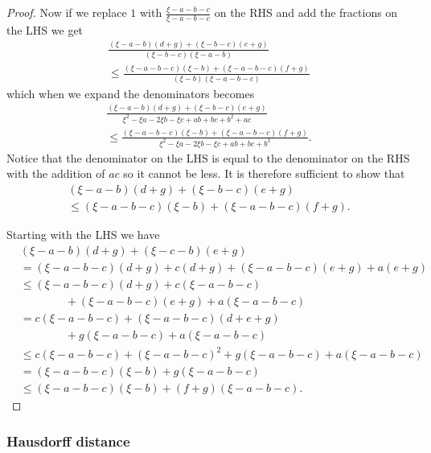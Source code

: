 \begin{proof}
  Now if we replace $1$ with $\frac{\xi -a-b-c}{\xi -a-b-c}$ on the RHS and add
  the fractions on the LHS we get
  \begin{multline*}
    \frac{(\xi -a-b)(d+g)+(\xi -b-c)(e+g)}{(\xi -b-c)(\xi -a-b)}\\
    \leq \frac{(\xi -a-b-c)(\xi -b)+(\xi -a-b-c)(f+g)}{(\xi -b)(\xi -a-b-c)}
  \end{multline*}
  which when we expand the denominators becomes
  \begin{multline*}
    \frac{(\xi -a-b)(d+g)+(\xi -b-c)(e+g)}{\xi ^2-\xi a-2\xi b-\xi c+ab+bc+b^2+ac}\\
    \leq \frac{(\xi -a-b-c)(\xi -b)+(\xi -a-b-c)(f+g)}{\xi ^2-\xi a-2\xi b-\xi c+ab+bc+b^2}.
  \end{multline*}
  Notice that the denominator on the LHS is equal to the denominator on the
  RHS with the addition of $ac$ so it cannot be less.  It is therefore
  sufficient to show that
  \begin{multline*}
    (\xi -a-b)(d+g)+(\xi -b-c)(e+g)\\
    \leq (\xi -a-b-c)(\xi -b)+(\xi -a-b-c)(f+g).
  \end{multline*}

  Starting with the LHS we have
  \begin{align*}
    &(\xi -a-b)(d+g)+(\xi -c-b)(e+g)\\
    &= (\xi -a-b-c)(d+g)+c(d+g)+(\xi -a-b-c)(e+g)+a(e+g)\\
    &\leq (\xi -a-b-c)(d+g)+c(\xi -a-b-c)\\
    &\qquad\qquad+(\xi -a-b-c)(e+g)+a(\xi -a-b-c)\\
    &= c(\xi -a-b-c)+(\xi -a-b-c)(d+e+g)\\
    &\qquad\qquad+g(\xi -a-b-c)+a(\xi -a-b-c)\\
    &\leq c(\xi -a-b-c)+(\xi -a-b-c)^2+g(\xi -a-b-c)+a(\xi -a-b-c)\\
    &= (\xi -a-b-c)(\xi -b)+g(\xi -a-b-c)\\
    &\leq (\xi -a-b-c)(\xi -b) + (f+g)(\xi -a-b-c).
  \end{align*}
\end{proof}

\subsubsection{Hausdorff distance}
\label{sec:hausdorff-distance}

